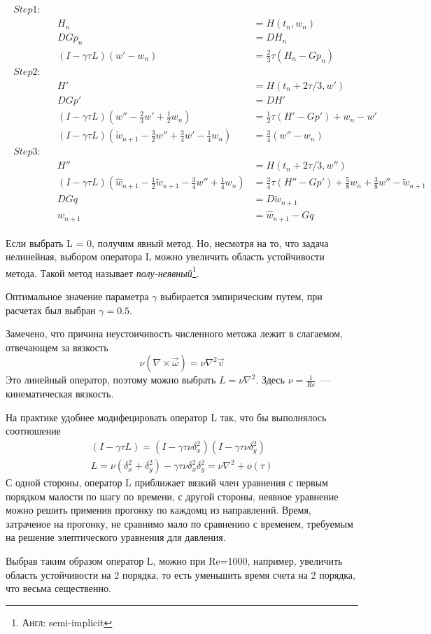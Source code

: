 \begin{gather}
\begin{align*}
Step 1:& \\
&&H_n &= H(t_n, w_n) \\
&&DGp_n &= DH_n \\
&&(I - \gamma \tau L)(w' - w_n) &= \frac{2}{3} \tau (H_n - Gp_n) \\
%
Step 2:& \\
&&H' &= H(t_n + 2\tau/3, w') \\
&&DGp' &= DH' \\
&&(I - \gamma \tau L)(w'' - \frac{2}{3}w' + \frac{1}{2}w_n) &= \frac{1}{2} \tau (H' - Gp') + w_n - w' \\
&&(I - \gamma \tau L)(\tilde w_{n+1} - \frac{3}{2}w'' + \frac{3}{4}w' - \frac{1}{4}w_n) &= \frac{3}{4}(w'' - w_n)\\
%
Step 3:& \\
&&H'' &= H(t_n + 2\tau/3, w'') \\
&&(I - \gamma \tau L)(\hat w_{n+1} - \frac{1}{2} \tilde w_{n+1} - \frac{3}{4}w'' + \frac{1}{4}w_n) &= \frac{3}{4} \tau (H'' - Gp') + 
	\frac{5}{8}w_n + \frac{3}{8}w'' - \tilde w_{n+1} \\
&&DGq &= D\tilde w_{n+1} \\
&&w_{n+1} &= \hat w_{n+1} - Gq
\end{align*}
\end{gather}

Если выбрать L = 0, получим явный метод. Но, несмотря на то, что задача нелинейная, выбором оператора L можно увеличить область устойчивости метода. Такой метод называет \textit{полу-неявный}\footnote{Англ: semi-implicit}. 

Оптимальное значение параметра $\gamma$ выбирается эмпирическим путем, при расчетах был выбран $\gamma=0.5$. 

Замечено, что причина неустоичивость численного метожа лежит в слагаемом, отвечающем за вязкость$$
	\nu (\nabla \times \vec \omega) = \nu \nabla ^2 \vec v
$$ Это линейный оператор, поэтому можно выбрать $L = \nu \nabla^2$. Здесь $\nu = \frac{1}{Re}$~--- кинематическая вязкость. 

На практике удобнее модифецировать оператор L так, что бы выполнялось соотношение
\begin{gather*}
	(I - \gamma \tau L) = (I - \gamma \tau \nu \delta_x^2)(I - \gamma \tau \nu \delta_y^2) \\
	L =  \nu (\delta_x^2 + \delta_y^2) - \gamma \tau \nu \delta_x^2 \delta_y^2 = \nu \nabla^2 + o(\tau)
\end{gather*}
С одной стороны, оператор L приближает вязкий член уравнения с первым порядком малости по шагу по времени, с другой стороны, неявное уравнение можно решить применив прогонку по каждомц из направлений. Время, затраченое на прогонку, не сравнимо мало по сравнению с временем, требуемым на решение элептического уравнения для давления. 

Выбрав таким образом оператор L, можно при Re=1000, например, увеличить область устойчивости на 2 порядка, то есть уменьшить время счета на 2 порядка, что весьма сещественно. 



